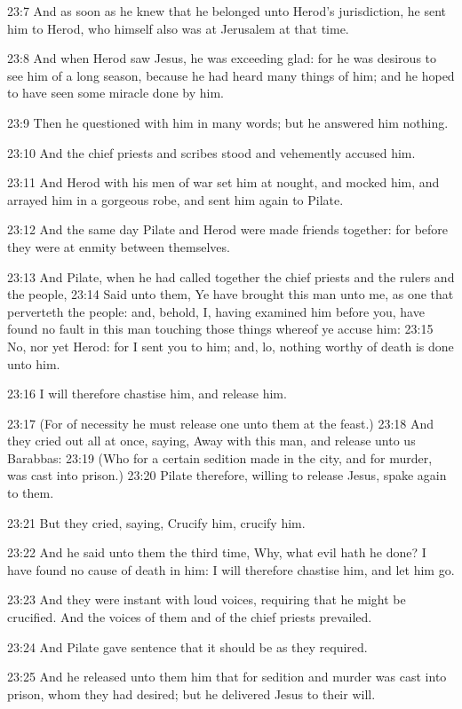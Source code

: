 23:7 And as soon as he knew that he belonged unto Herod's jurisdiction, he sent him to Herod, who himself also was at Jerusalem at that time.

23:8 And when Herod saw Jesus, he was exceeding glad: for he was desirous to see him of a long season, because he had heard many things of him; and he hoped to have seen some miracle done by him.

23:9 Then he questioned with him in many words; but he answered him nothing.

23:10 And the chief priests and scribes stood and vehemently accused him.

23:11 And Herod with his men of war set him at nought, and mocked him, and arrayed him in a gorgeous robe, and sent him again to Pilate.

23:12 And the same day Pilate and Herod were made friends together: for before they were at enmity between themselves.

23:13 And Pilate, when he had called together the chief priests and the rulers and the people, 23:14 Said unto them, Ye have brought this man unto me, as one that perverteth the people: and, behold, I, having examined him before you, have found no fault in this man touching those things whereof ye accuse him: 23:15 No, nor yet Herod: for I sent you to him; and, lo, nothing worthy of death is done unto him.

23:16 I will therefore chastise him, and release him.

23:17 (For of necessity he must release one unto them at the feast.)  23:18 And they cried out all at once, saying, Away with this man, and release unto us Barabbas: 23:19 (Who for a certain sedition made in the city, and for murder, was cast into prison.)  23:20 Pilate therefore, willing to release Jesus, spake again to them.

23:21 But they cried, saying, Crucify him, crucify him.

23:22 And he said unto them the third time, Why, what evil hath he done? I have found no cause of death in him: I will therefore chastise him, and let him go.

23:23 And they were instant with loud voices, requiring that he might be crucified. And the voices of them and of the chief priests prevailed.

23:24 And Pilate gave sentence that it should be as they required.

23:25 And he released unto them him that for sedition and murder was cast into prison, whom they had desired; but he delivered Jesus to their will.

